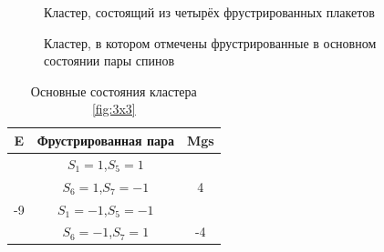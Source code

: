 \documentclass[utf8, babel, sor, jor, amsmath, amssymb, reprint]{elsarticle} %
\begin{document}
\begin{figure}[H]
	\centering
	\caption{Кластер, состоящий из четырёх фрустрированных плакетов}
	\label{fig:cl}
\end{figure}

\begin{figure}[H]
	\centering
	\caption{Кластер, в котором отмечены фрустрированные в основном состоянии пары спинов}
	\label{fig:clF}
\end{figure}

\begin{table}[H]
	\centering
	\begin{tabular}{|c|c|c|}
		\hline
		E   &   Фрустрированная пара & Mgs\\
		\hline
		   &  $S_1=1$,$S_5=1$&\\
		&    $S_6=1$,$S_7=-1$ & 4\\
	\cline{2-3}
		-9	\multirow{3}{*}{}
		   &  $S_1=-1$,$S_5=-1$&\\
		&    $S_6=-1$,$S_7=1$ & -4\\
		\hline
	\end{tabular}
	\caption{Основные состояния кластера \ref{fig:3x3}}
	\label{tab:gscl}
\end{table} 
\end{document}
